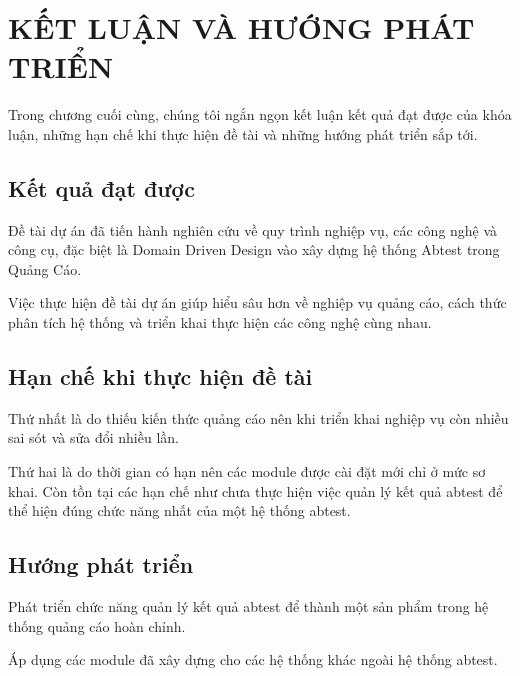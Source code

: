 \chapter{KẾT LUẬN VÀ HƯỚNG PHÁT TRIỂN}

Trong chương cuối cùng, chúng tôi ngắn ngọn kết luận kết quả đạt được của khóa luận, những hạn chế khi thực hiện đề tài và những hướng phát triển sắp tới.

\section{Kết quả đạt được}

Đề tài dự án đã tiến hành nghiên cứu về quy trình nghiệp vụ, các công nghệ và công cụ, đặc biệt là Domain Driven Design vào xây dựng hệ thống Abtest trong Quảng Cáo.

Việc thực hiện đề tài dự án giúp hiểu sâu hơn về nghiệp vụ quảng cáo, cách thức phân tích hệ thống và triển khai thực hiện các công nghệ cùng nhau.

\section{Hạn chế khi thực hiện đề tài}

Thứ nhất là do thiếu kiến thức quảng cáo nên khi triển khai nghiệp vụ còn nhiều sai sót và sửa đổi nhiều lần.

Thứ hai là do thời gian có hạn nên các module được cài đặt mới chỉ ở mức sơ khai. Còn tồn tại các hạn chế như chưa thực hiện việc quản lý kết quả abtest để thể hiện đúng chức năng nhất của một hệ thống abtest.

\section{Hướng phát triển}

Phát triển chức năng quản lý kết quả abtest để thành một sản phẩm trong hệ thống quảng cáo hoàn chỉnh.

Áp dụng các module đã xây dựng cho các hệ thống khác ngoài hệ thống abtest.
